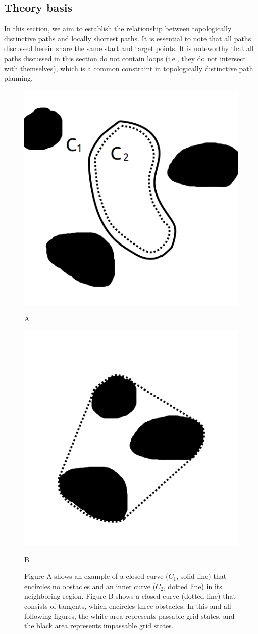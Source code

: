 \documentclass[letterpaper, 10 pt, journal, twoside]{IEEEtran}
\begin{document}
\subsection{Theory basis}

In this section, we aim to establish the relationship between topologically distinctive paths and locally shortest paths. It is essential to note that all paths discussed herein share the same start and target points. It is noteworthy that all paths discussed in this section do not contain loops (i.e., they do not intersect with themselves), which is a common constraint in topologically distinctive path planning.


\begin{figure}[t] \scriptsize
\begin{minipage}{.48\linewidth}
  \centerline{\includegraphics[width=4.cm, cframe=gray .2mm]{empty_closed.png}}
  \centerline{A}
\end{minipage}
\hfill
\begin{minipage}{.48\linewidth}
  \centerline{\includegraphics[width=4.cm, cframe=gray .2mm]{tangent_closed.png}}
  \centerline{B}
\end{minipage}
\vfill

\caption{Figure A shows an example of a closed curve ($C_1$, solid line) that encircles no obstacles and an inner curve ($C_2$, dotted line) in its neighboring region. Figure B shows a closed curve (dotted line) that consists of tangents, which encircles three obstacles. In this and all following figures, the white area represents passable grid states, and the black area represents impassable grid states.}
\label{closed_curve}
\end{figure}
\end{document}
